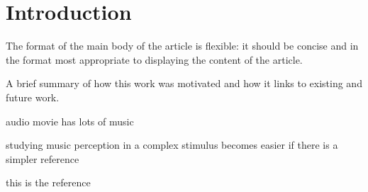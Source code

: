 \section*{Introduction} 
The format of the main body of the article is flexible: it should be concise and in the format most appropriate to displaying the content of the article.

A brief summary of how this work was motivated and how it links to existing and future work.

audio movie has lots of music

studying music perception in a complex stimulus becomes easier if there is a simpler reference

this is the reference